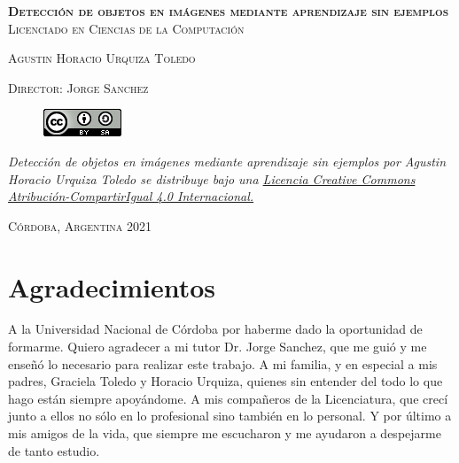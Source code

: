 \documentclass[12pt,twosided]{book}
\begin{document}
\begin{titlepage}
\begin{center}
\vspace{1em}

\textsc{\huge \textbf{Detección de objetos en imágenes mediante aprendizaje sin ejemplos}}\\[2em]

\textsc{Licenciado en Ciencias de la Computación}

\textsc{}

\textsc{\Large Agustin Horacio Urquiza Toledo}

\textsc{\large Director: Jorge Sanchez}

\end{center}

\begin{center}
\begin{figure}[h]
\begin{center}
\includegraphics[]{lic.png}
\end{center}
\end{figure}
\textit{Detección de objetos en imágenes mediante aprendizaje sin ejemplos por Agustin Horacio Urquiza Toledo se distribuye bajo una \href{http://creativecommons.org/licenses/by-sa/4.0/}{\color{blue}Licencia Creative Commons Atribución-CompartirIgual 4.0 Internacional.}}
\end{center}

\textsc{Córdoba, Argentina \hspace*{\fill} 2021}
\end{titlepage}


\chapter*{Agradecimientos}
A la Universidad Nacional de Córdoba por haberme dado la
oportunidad de formarme. Quiero agradecer a mi tutor Dr. Jorge Sanchez, que me guió y me enseñó lo necesario para realizar este trabajo. A mi familia, y en especial a mis padres, Graciela Toledo y Horacio Urquiza, quienes sin entender del todo lo que hago están siempre apoyándome. A mis compañeros de la Licenciatura, que crecí junto a ellos no sólo en lo profesional sino también en lo personal. Y por último a mis amigos de la vida, que siempre me escucharon y me ayudaron a despejarme de tanto estudio.
\end{document}

